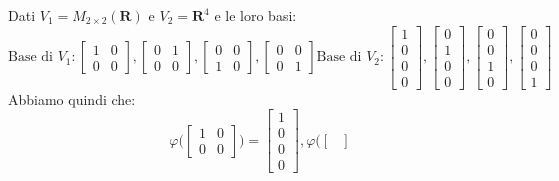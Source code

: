 \begin{example}
	Dati $V_1 = M_{2 \times 2}(\mathbf{R})$ e $V_2 = \mathbf{R}^4$ e le loro basi:
	\begin{equation*}
		\text{Base di }V_1:
		\begin{bmatrix}
			1 & 0 \\
			0 & 0
		\end{bmatrix},
		\begin{bmatrix}
			0 & 1 \\
			0 & 0
		\end{bmatrix},
		\begin{bmatrix}
			0 & 0 \\
			1 & 0
		\end{bmatrix},
		\begin{bmatrix}
			0 & 0 \\
			0 & 1
		\end{bmatrix}
		\text{Base di }V_2:
		\begin{bmatrix}
			1 \\ 0 \\ 0 \\ 0
		\end{bmatrix},
		\begin{bmatrix}
			0 \\ 1 \\ 0 \\ 0
		\end{bmatrix},
		\begin{bmatrix}
			0 \\ 0 \\ 1 \\ 0
		\end{bmatrix},
		\begin{bmatrix}
			0 \\ 0 \\ 0 \\ 1
		\end{bmatrix}
	\end{equation*}
	Abbiamo quindi che:
	\begin{equation*}
		\varphi \bigg(
		\begin{bmatrix}
			1 & 0 \\
			0 & 0
		\end{bmatrix}
		\bigg)
		=
		\begin{bmatrix}
			1 \\ 0 \\ 0 \\ 0
		\end{bmatrix},
		\varphi \bigg(
		\begin{bmatrix}

\end{bmatrix}
\end{equation*}
\end{example}
